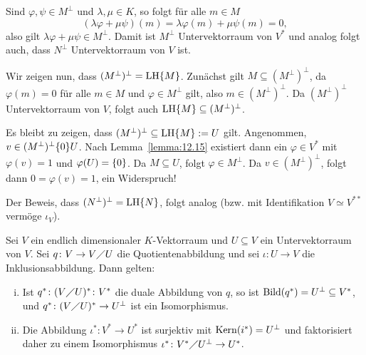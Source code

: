 \begin{beweis}
	Sind $\varphi, \psi \in M^\perp$ und $\lambda, \mu \in K$, so folgt für alle $m \in M$
	\[
	(\lambda \varphi + \mu \psi)(m) = \lambda \varphi(m) + \mu \psi(m) = 0,
	\]
	also gilt $\lambda \varphi + \mu \psi \in M^\perp$.
	Damit ist $M^\perp$ Untervektorraum von $V^*$ und analog folgt auch, dass $N^\perp$ Untervektorraum von $V$ ist.
	
	Wir zeigen nun, dass $(M^\perp)^\perp = \operatorname{LH}\{M\}$.
	Zunächst gilt $M \subseteq (M^\perp)^\perp$, da $\varphi(m) = 0$ für alle $m \in M$ und $\varphi \in M^\perp$ gilt, also $m \in (M^\perp)^\perp$.
	Da $(M^\perp)^\perp$ Untervektorraum von $V$, folgt auch $\operatorname{LH}\{M\} \subseteq (M^\perp)^\perp$.
	
	Es bleibt zu zeigen, dass $(M^\perp)^\perp \subseteq \operatorname{LH}\{M\} := U$ gilt.
	Angenommen, $v \in (M^\perp)^\perp \{0\} U$.
	Nach Lemma~\ref{lemma:12.15} existiert dann ein $\varphi \in V^*$ mit $\varphi(v) = 1$ und $\varphi(U)=\{0\}$.
	Da $M \subseteq U$, folgt $\varphi \in M^\perp$.
	Da $v \in (M^\perp)^\perp$, folgt dann $0 = \varphi(v) = 1$, ein Widerspruch!
	
	Der Beweis, dass $(N^\perp)^\perp = \operatorname{LH} \{N\}$, folgt analog (bzw. mit Identifikation $V \simeq V^{**}$ vermöge $\iota_V$). 
\end{beweis}

\begin{satz}
	\label{satz:12.16}
	Sei $V$ ein endlich dimensionaler $K$-Vektorraum und $U \subseteq V$ ein Untervektorraum von $V$.
	Sei $q \colon V \rightarrow V \diagup U$ die Quotientenabbildung und sei $\iota \colon U \rightarrow V$ die Inklusionsabbildung.
	Dann gelten:
	\begin{enumerate}[(i)]
		\item Ist $q^*\colon (V \diagup U)^* \colon V^*$ die duale Abbildung von $q$, so ist $\operatorname{Bild}(q^*) = U^\perp \subseteq V^*$, und $q^*\colon (V \diagup U)^* \rightarrow U^\perp$ ist ein Isomorphismus.
		\item Die Abbildung $\iota^*\colon V^* \rightarrow U^*$ ist surjektiv mit $\operatorname{Kern}(i^*) = U^\perp$ und faktorisiert daher zu einem Isomorphismus $\iota^* \colon V^* \diagup U^\perp \rightarrow U^*$.
	\end{enumerate}
\end{satz}

